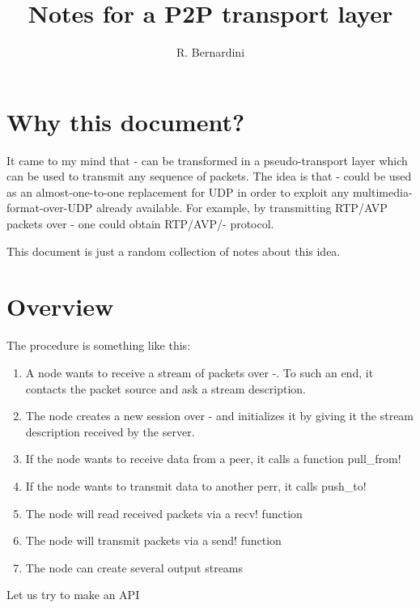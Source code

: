 \documentclass{article}
\title{Notes for a P2P transport layer}
\author{R. Bernardini}
\begin{document}
  \maketitle
\section{Why this document?}
It came to my mind that \medusa- can be transformed in a
pseudo-transport layer which can be used to transmit any sequence of
packets.  The idea is that \medusa- could be used as an
almost-one-to-one replacement for UDP in order to exploit any
multimedia-format-over-UDP already available.  For example, by
transmitting RTP/AVP packets over \medusa- one could obtain
RTP/AVP/\medusa- protocol.

This document is just a random collection of notes about this idea.

\section{Overview}
\label{sect:0;transport_layer}

The procedure is something like this:

\begin{enumerate}
\item
A node wants to receive a stream of packets over \medusa-.  To such an
end, it contacts the packet source and ask a stream description.
\item
The node creates a new session over \medusa- and initializes it by
giving it the stream description received by the server.
\item
If the node wants to receive data from a peer, it calls a function
\ttt pull_from!
\item
If the node wants to transmit data to another perr, it calls \ttt
push_to! 
\item
The node will read received packets via a \ttt recv! function
\item
The node will transmit packets via a \ttt send! function
\item 
The node can create several output streams
\end{enumerate}
%
Let us try to make an API
\end{document}
